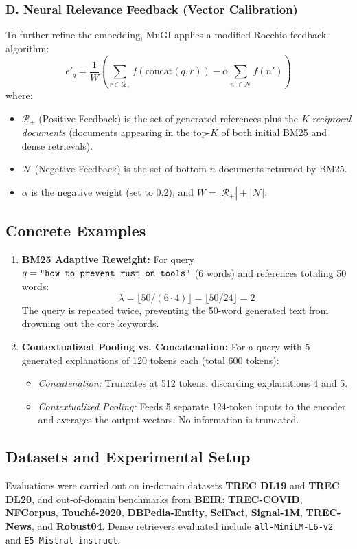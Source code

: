 \documentclass[11pt,a4paper]{article}
\begin{document}
\subsubsection{D. Neural Relevance Feedback (Vector Calibration)}
To further refine the embedding, MuGI applies a modified Rocchio feedback algorithm:
\begin{equation}
e'_q = \frac{1}{W} \left( \sum_{r \in \mathcal{R}_+} f(\text{concat}(q, r)) - \alpha \sum_{n' \in \mathcal{N}} f(n') \right)
\end{equation}
where:
\begin{itemize}
    \item $\mathcal{R}_+$ (Positive Feedback) is the set of generated references plus the \textit{K-reciprocal documents} (documents appearing in the top-$K$ of both initial BM25 and dense retrievals).
    \item $\mathcal{N}$ (Negative Feedback) is the set of bottom $n$ documents returned by BM25.
    \item $\alpha$ is the negative weight (set to $0.2$), and $W = |\mathcal{R}_+| + |\mathcal{N}|$.
\end{itemize}

\subsection{Concrete Examples}
\begin{enumerate}
    \item \textbf{BM25 Adaptive Reweight:}
    For query $q = \text{\texttt{"how to prevent rust on tools"}}$ (6 words) and references totaling 50 words:
    $$\lambda = \lfloor 50 / (6 \cdot 4) \rfloor = \lfloor 50 / 24 \rfloor = 2$$
    The query is repeated twice, preventing the 50-word generated text from drowning out the core keywords.
    \item \textbf{Contextualized Pooling vs. Concatenation:}
    For a query with 5 generated explanations of 120 tokens each (total 600 tokens):
    \begin{itemize}
        \item \textit{Concatenation:} Truncates at 512 tokens, discarding explanations 4 and 5.
        \item \textit{Contextualized Pooling:} Feeds 5 separate 124-token inputs to the encoder and averages the output vectors. No information is truncated.
    \end{itemize}
\end{enumerate}

\subsection{Datasets and Experimental Setup}
Evaluations were carried out on in-domain datasets \textbf{TREC DL19} and \textbf{TREC DL20}, and out-of-domain benchmarks from \textbf{BEIR}: \textbf{TREC-COVID}, \textbf{NFCorpus}, \textbf{Touch\'{e}-2020}, \textbf{DBPedia-Entity}, \textbf{SciFact}, \textbf{Signal-1M}, \textbf{TREC-News}, and \textbf{Robust04}. Dense retrievers evaluated include \texttt{all-MiniLM-L6-v2} and \texttt{E5-Mistral-instruct}.
\end{document}
